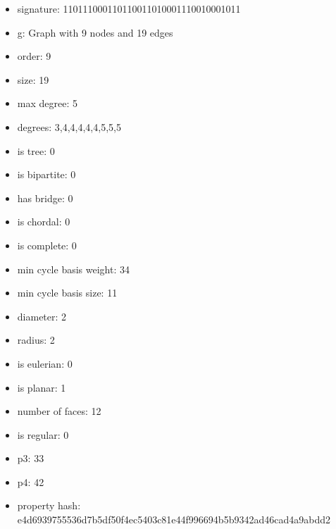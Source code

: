 \newpage
\begin{figure}
\end{figure}
\begin{itemize}
\item signature: 110111000110110011010001110010001011
\item g: Graph with 9 nodes and 19 edges
\item order: 9
\item size: 19
\item max degree: 5
\item degrees: 3,4,4,4,4,4,5,5,5
\item is tree: 0
\item is bipartite: 0
\item has bridge: 0
\item is chordal: 0
\item is complete: 0
\item min cycle basis weight: 34
\item min cycle basis size: 11
\item diameter: 2
\item radius: 2
\item is eulerian: 0
\item is planar: 1
\item number of faces: 12
\item is regular: 0
\item p3: 33
\item p4: 42
\item property hash: e4d6939755536d7b5df50f4ec5403c81e44f996694b5b9342ad46cad4a9abdd2
\end{itemize}
